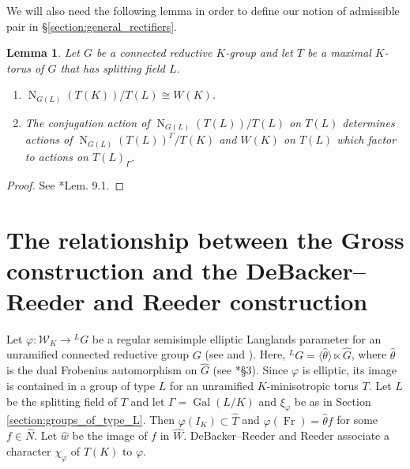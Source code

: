 \documentclass{mrlart7}
\theoremstyle{plain}
\newtheorem{lemma}[theorem]{Lemma}
\theoremstyle{definition}
\numberwithin{equation}{section}
\DeclareMathOperator{\Gal}{Gal}
\DeclareMathOperator{\Fr}{Fr}
\newcommand{\Weil}{\mathcal{W}}
\newcommand{\Normalizer}[2]{\operatorname{N}_{#2}(#1)}
\begin{document}
We will also need the following lemma in order to define our notion of admissible pair
in \S\ref{section:general_rectifiers}.

\begin{lemma} \label{lem:weyl_groups}
Let $G$ be a connected reductive $K$-group and let $T$ be a maximal
$K$-torus of $G$ that has splitting field $L$.
\begin{enumerate}
\item $\Normalizer{T(K)}{G(L)} / T(L) \cong W(K)$.
\item The conjugation action of $\Normalizer{T(L)}{G(L)} / T(L)$ on $T(L)$ determines
actions of $\Normalizer{T(L)}{G(L)}^\Gamma / T(K)$ and $W(K)$
on $T(L)$ which factor to actions on $T(L)_\Gamma$.
\end{enumerate}
\end{lemma}

\begin{proof}
See \cite{adrian-lansky:ppa}*{Lem. 9.1}.
\end{proof}

\section{The relationship between the Gross construction and the DeBacker--Reeder and Reeder construction}
\label{section:gross_debacker_reeder}

Let $\varphi : \Weil_K \rightarrow {}^L G$ be a regular semisimple elliptic Langlands
parameter for an unramified connected reductive group $G$
(see \cite{reeder-debacker:09a} and \cite{reeder:08a}).
Here, ${}^L G = \langle \hat{\theta} \rangle \ltimes \hat{G}$,
where $\hat{\theta}$ is the dual Frobenius automorphism on $\hat{G}$
(see \cite{reeder-debacker:09a}*{\S 3}).
Since $\varphi$ is elliptic, its image is contained in a group of type $L$ for an unramified $K$-minisotropic torus $T$.
Let $L$ be the splitting field of $T$ and let $\Gamma = \Gal(L/K)$ and $\xi_\varphi$ be as in Section \ref{section:groups_of_type_L}.
Then $\varphi(I_K) \subset \hat{T}$ and
$\varphi(\Fr) = \hat{\theta} f$ for some $f \in \hat{N}$.  Let $\hat{w}$
be the image of $f$ in $\hat{W}$.
DeBacker--Reeder \cite{reeder-debacker:09a} and Reeder \cite{reeder:08a}
associate a character $\chi_{\varphi}$ of $T(K)$ to $\varphi$.
\end{document}
